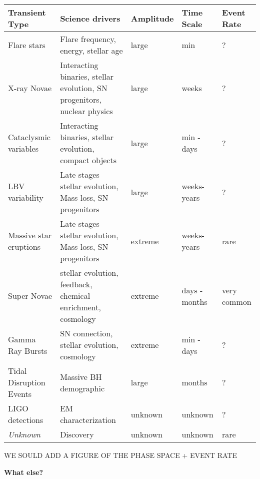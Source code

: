 \begin{center}
  \begin{tabular}{| p{4.5cm} | p{6.0cm} | l | l | p{0.5cm}|}
    \hline

    Transient Type & Science drivers & Amplitude & Time Scale & Event Rate\\
\hline

Flare stars & Flare frequency, energy, stellar age & large & min & ?\\

X-ray Novae & Interacting binaries, stellar evolution, SN progenitors, nuclear physics & large & weeks & ?\\

Cataclysmic variables & Interacting binaries, stellar evolution, compact objects & large & min - days & ?\\

LBV variability & Late stages stellar evolution, Mass loss, SN progenitors & large & weeks-years & ?\\

Massive star eruptions & Late stages stellar evolution, Mass loss, SN progenitors & extreme & weeks-years & rare\\

Super Novae & stellar evolution, feedback, chemical enrichment, cosmology & extreme & days - months & very common\\

Gamma Ray Bursts & SN connection, stellar evolution, cosmology & extreme & min - days & ?\\

Tidal Disruption Events & Massive BH demographic & large & months & ?\\

LIGO detections & EM characterization & unknown & unknown & ?\\

\emph{Unknown} & Discovery & unknown & unknown & rare\\

 \hline \end{tabular}
\end{center}

WE SOULD ADD A FIGURE OF THE PHASE SPACE + EVENT RATE


{\bf What else?}




%




